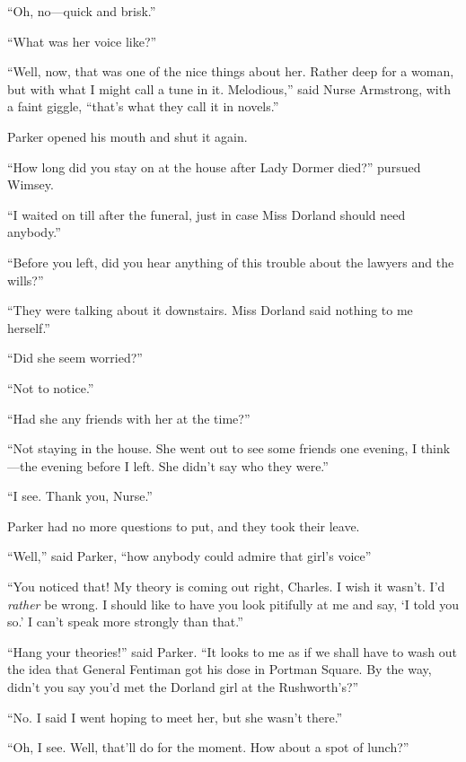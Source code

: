 \enquote{Oh, no\allowbreak---\allowbreak quick and brisk.}

\enquote{What was her voice like?}

\enquote{Well, now, that was one of the nice things about her. Rather deep for a woman, but with what I might call a tune in it. Melodious,} said Nurse Armstrong, with a faint giggle, \enquote{that's what they call it in novels.}

Parker opened his mouth and shut it again.

\enquote{How long did you stay on at the house after Lady Dormer died?} pursued Wimsey.

\enquote{I waited on till after the funeral, just in case Miss Dorland should need anybody.}

\enquote{Before you left, did you hear anything of this trouble about the lawyers and the wills?}

\enquote{They were talking about it downstairs. Miss Dorland said nothing to me herself.}

\enquote{Did she seem worried?}

\enquote{Not to notice.}

\enquote{Had she any friends with her at the time?}

\enquote{Not staying in the house. She went out to see some friends one evening, I think\allowbreak---\allowbreak the evening before I left. She didn't say who they were.}

\enquote{I see. Thank you, Nurse.}

Parker had no more questions to put, and they took their leave.

\enquote{Well,} said Parker, \enquote{how anybody could admire that girl's voice\longdash}

\enquote{You noticed that! My theory is coming out right, Charles. I wish it wasn't. I'd \textit{rather} be wrong. I should like to have you look pitifully at me and say, \enquote{I told you so.} I can't speak more strongly than that.}

\enquote{Hang your theories!} said Parker. \enquote{It looks to me as if we shall have to wash out the idea that General Fentiman got his dose in Portman Square. By the way, didn't you say you'd met the Dorland girl at the Rushworth's?}

\enquote{No. I said I went hoping to meet her, but she wasn't there.}

\enquote{Oh, I see. Well, that'll do for the moment. How about a spot of lunch?}

